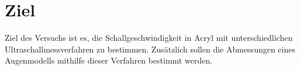 \section{Ziel}
\label{sec:Ziel}

Ziel des Versuchs ist es, die Schallgeschwindigkeit in Acryl mit unterschiedlichen Ultraschallmessverfahren zu bestimmen.
Zusätzlich sollen die Abmessungen eines Augenmodells mithilfe dieser Verfahren bestimmt werden.